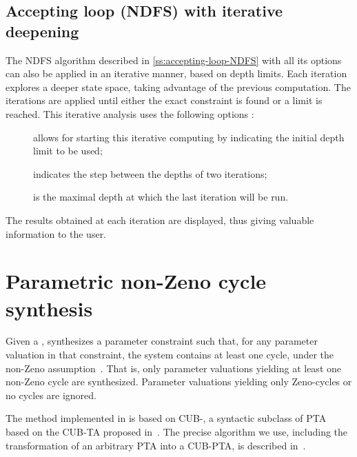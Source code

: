 \subsection{Accepting loop (NDFS) with iterative deepening}\label{ss:accepting-loop-NDFS-iterative}

The NDFS algorithm described in \cref{ss:accepting-loop-NDFS} with all its options
can also be applied
in an iterative manner, based on depth limits. Each iteration explores a deeper state
space, taking advantage of the previous computation. The iterations are applied until
either the exact constraint is found or a limit is reached. This iterative analysis
uses the following options :

\begin{description}
	\item[] allows for starting this iterative computing by indicating
	      the initial depth limit to be used;
	\item[] indicates the step between the depths of two iterations;
	\item[] is the maximal depth at which the last iteration
	      will be run.
\end{description}

The results obtained at each iteration are displayed, thus giving valuable information
to the user.

\section{Parametric non-Zeno cycle synthesis}\label{ss:mode:Zeno}

Given a \NIPTA{}, \imitator{} synthesizes a parameter constraint such that, for any parameter valuation in that constraint, the system contains at least one cycle, under the non-Zeno assumption~\cite{ANPS17}.
That is, only parameter valuations yielding at least one non-Zeno cycle are synthesized.
Parameter valuations yielding only Zeno-cycles or no cycles are ignored.

The method implemented in \imitator{} is based on CUB-\IPTA{}, a syntactic subclass of PTA based on the CUB-TA proposed in~\cite{WSWLSDYL15}.
The precise algorithm we use, including the transformation of an arbitrary PTA into a CUB-PTA, is described in~\cite{ANPS17}.


